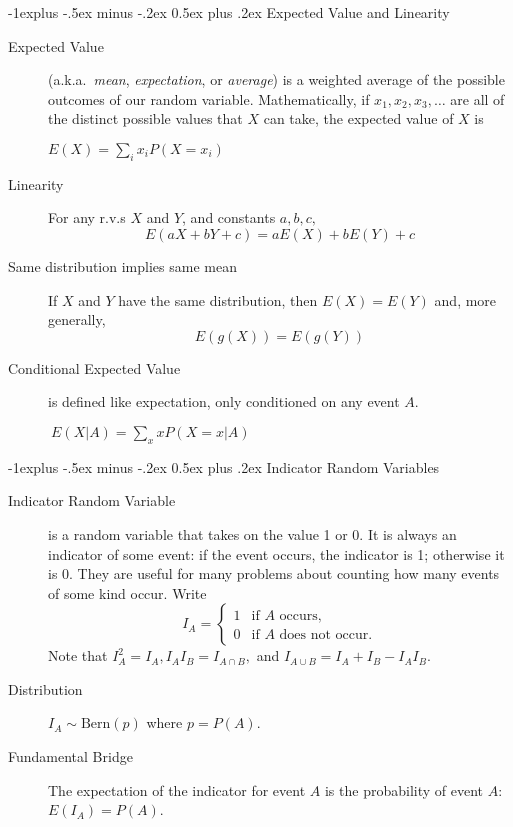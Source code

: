 \documentclass[10pt,landscape]{article}
\makeatletter
\newcommand{\Bern}{\textrm{Bern}}
\renewcommand{\subsection}{\@startsection{subsection}{2}{0mm}%
                                {-1explus -.5ex minus -.2ex}%
                                {0.5ex plus .2ex}%
                                {\normalfont\normalsize\bfseries}}
\makeatother
\begin{document}
\begin{multicols*}{3}
\subsection{Expected Value and Linearity}
\begin{description}
\item[Expected Value] (a.k.a.~\emph{mean}, \emph{expectation}, or \emph{average}) is a weighted average of the possible outcomes of our random variable. Mathematically, if $x_1, x_2, x_3, \dots$ are all of the distinct possible values that $X$ can take, the expected value of $X$ is
\begin{center}
$E(X) = \sum\limits_{i}x_iP(X=x_i)$
\end{center}


\item[Linearity] For any r.v.s $X$ and $Y$, and constants $a,b,c,$ 
\[E(aX + bY + c) = aE(X) + bE(Y) + c \]

\item[Same distribution implies same mean] If $X$ and $Y$ have the same distribution, then $E(X)=E(Y)$ and, more generally, 
$$E(g(X)) = E(g(Y))$$


\item[Conditional Expected Value] is defined like expectation, only conditioned on any event $A$. \begin{center}
$\ E(X | A) = \sum\limits_{x}xP(X=x | A)$
\end{center}

\end{description}

\subsection{Indicator Random Variables}
\begin{description}
\item[Indicator Random Variable] is a random variable that takes on the value 1 or 0. It is always an indicator of some event: if the event occurs, the indicator is 1; otherwise it is 0. They are useful for many problems about counting how many events of some kind occur. Write \[
I_A =
 \begin{cases}
   1 & \text{if $A$ occurs,} \\
   0 & \text{if $A$ does not occur.}
  \end{cases}
\]
Note that $I_A^2 = I_A, I_A I_B = I_{A \cap B}, $ and $I_{A \cup B} = I_A + I_B - I_A I_B$. 
\item[Distribution] $I_A \sim \Bern(p)$ where $p = P(A)$.
\item[Fundamental Bridge] The expectation of the indicator for event $A$ is the probability of event $A$: $E(I_A) = P(A)$. 
\end{description}


\end{multicols*}
\end{document}
